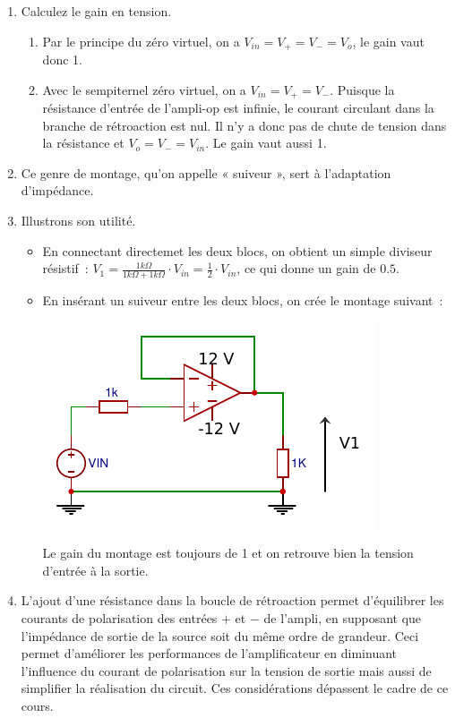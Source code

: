 \documentclass{../../template/tp}
\begin{document}
{
    \begin{enumerate}
        \item Calculez le gain en tension.
        \begin{enumerate}[label=\alph*)]
            \item Par le principe du zéro virtuel, on a $V_{in} = V_+ = V_- = V_o$, le gain vaut donc 1.
            \item Avec le sempiternel zéro virtuel, on a $V_{in} = V_+ = V_-$. Puisque la résistance d'entrée de l'ampli-op est infinie, le courant circulant dans la branche de rétroaction est nul. Il n'y a donc pas de chute de tension dans la résistance et $V_o = V_- = V_{in}$. Le gain vaut aussi 1.
        \end{enumerate}

        \item Ce genre de montage, qu'on appelle « suiveur », sert à l'adaptation d'impédance.

        \item Illustrons son utilité.
        \begin{itemize}
            \item En connectant directemet les deux blocs, on obtient un simple diviseur résistif~: $V_1 = \frac{1k\Omega}{1k\Omega+1k\Omega} \cdot V_{in} = \frac{1}{2}\cdot V_{in}$, ce qui donne un gain de $0.5$.

            \item En insérant un suiveur entre les deux blocs, on crée le montage suivant~:
            \begin{center}
                \includegraphics[scale=1.4]{suiveur-adaptation-impedance.pdf}
            \end{center}

            Le gain du montage est toujours de 1 et on retrouve bien la tension d'entrée à la sortie.
        \end{itemize}
        \item %
        L'ajout d'une résistance dans la boucle de rétroaction permet d'équilibrer les courants de polarisation des entrées $+$ et $-$ de l'ampli, en supposant que l'impédance de sortie de la source soit du même ordre de grandeur. Ceci permet d'améliorer les performances de l'amplificateur en diminuant l'influence du courant de polarisation sur la tension de sortie mais aussi de simplifier la réalisation du circuit. Ces considérations dépassent le cadre de ce cours.
    \end{enumerate}
}
\end{document}
